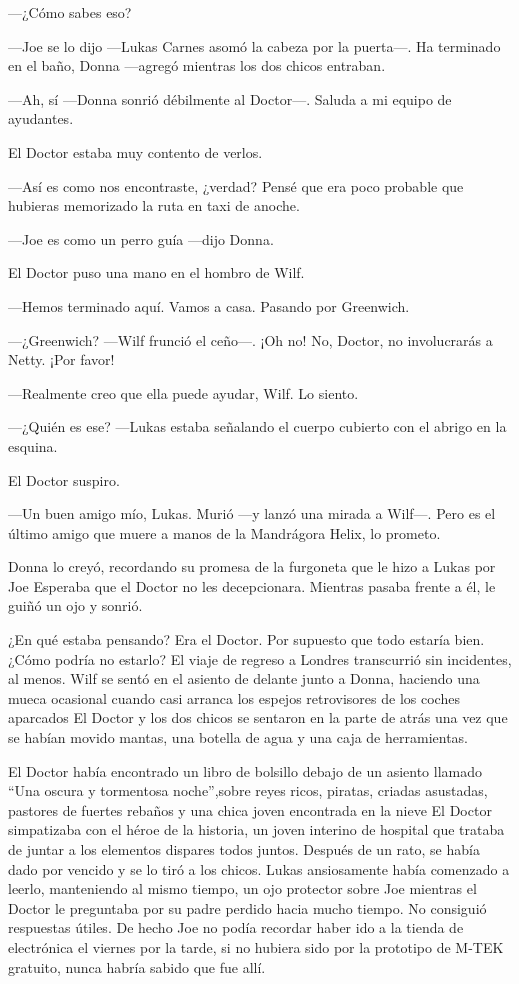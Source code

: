 ---¿Cómo sabes eso?

---Joe se lo dijo ---Lukas Carnes asomó la cabeza por la puerta---. Ha
terminado en el baño, Donna ---agregó mientras los dos chicos entraban.

---Ah, sí ---Donna sonrió débilmente al Doctor---. Saluda a mi equipo de
ayudantes.

El Doctor estaba muy contento de verlos.

---Así es como nos encontraste, ¿verdad? Pensé que era poco probable
que hubieras memorizado la ruta en taxi de anoche.

---Joe es como un perro guía ---dijo Donna.

El Doctor puso una mano en el hombro de Wilf.

---Hemos terminado aquí. Vamos a casa. Pasando por Greenwich.

---¿Greenwich? ---Wilf frunció el ceño---. ¡Oh no! No, Doctor, no
involucrarás a Netty. ¡Por favor!

---Realmente creo que ella puede ayudar, Wilf. Lo siento.

---¿Quién es ese? ---Lukas estaba señalando el cuerpo cubierto con el
abrigo en la esquina.

El Doctor suspiro.

---Un buen amigo mío, Lukas. Murió ---y lanzó una mirada a Wilf---. Pero
es el último amigo que muere a manos de la Mandrágora Helix, lo prometo.

Donna lo creyó, recordando su promesa de la furgoneta que le hizo a
Lukas por Joe Esperaba que el Doctor no les decepcionara. Mientras
pasaba frente a él, le guiñó un ojo y sonrió.

¿En qué estaba pensando? Era el Doctor. Por supuesto que todo estaría
bien. ¿Cómo podría no estarlo? El viaje de regreso a Londres
transcurrió sin incidentes, al menos. Wilf se sentó en el asiento de
delante junto a Donna, haciendo una mueca ocasional cuando casi arranca
los espejos retrovisores de los coches aparcados El Doctor y los dos
chicos se sentaron en la parte de atrás una vez que se habían movido
mantas, una botella de agua y una caja de herramientas.

El Doctor había encontrado un libro de bolsillo debajo de un asiento
llamado ``Una oscura y tormentosa noche'',sobre reyes ricos, piratas,
criadas asustadas, pastores de fuertes rebaños y una chica joven
encontrada en la nieve El Doctor simpatizaba con el héroe de la
historia, un joven interino de hospital que trataba de juntar a los
elementos dispares todos juntos. Después de un rato, se había dado por
vencido y se lo tiró a los chicos. Lukas ansiosamente había comenzado a
leerlo, manteniendo al mismo tiempo, un ojo protector sobre Joe mientras
el Doctor le preguntaba por su padre perdido hacia mucho tiempo. No
consiguió respuestas útiles. De hecho Joe no podía recordar haber ido a
la tienda de electrónica el viernes por la tarde, si no hubiera sido por
la prototipo de M-TEK gratuito, nunca habría sabido que fue allí.

